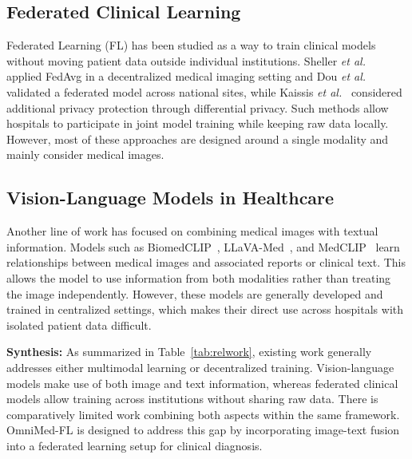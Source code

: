 \documentclass[letterpaper, conference]{IEEEtran}
\begin{document}
\subsection{Federated Clinical Learning}
Federated Learning (FL) has been studied as a way to train clinical models without moving patient data outside individual institutions. Sheller \textit{et al.}~\cite{Sheller2020} applied FedAvg in a decentralized medical imaging setting and Dou \textit{et al.}~\cite{Dou2021} validated a federated model across national sites, while Kaissis \textit{et al.}~\cite{Kaissis2021} considered additional privacy protection through differential privacy. Such methods allow hospitals to participate in joint model training while keeping raw data locally. However, most of these approaches are designed around a single modality and mainly consider medical images.

\subsection{Vision-Language Models in Healthcare}
Another line of work has focused on combining medical images with textual information. Models such as BiomedCLIP~\cite{Zhang2023biomedclip}, LLaVA-Med~\cite{Li2023llavamed}, and MedCLIP~\cite{Wang2022medclip} learn relationships between medical images and associated reports or clinical text. This allows the model to use information from both modalities rather than treating the image independently. However, these models are generally developed and trained in centralized settings, which makes their direct use across hospitals with isolated patient data difficult.

\textbf{Synthesis:}
As summarized in Table~\ref{tab:relwork}, existing work generally addresses either multimodal learning or decentralized training. Vision-language models make use of both image and text information, whereas federated clinical models allow training across institutions without sharing raw data. There is comparatively limited work combining both aspects within the same framework. OmniMed-FL is designed to address this gap by incorporating image-text fusion into a federated learning setup for clinical diagnosis.
\end{document}
